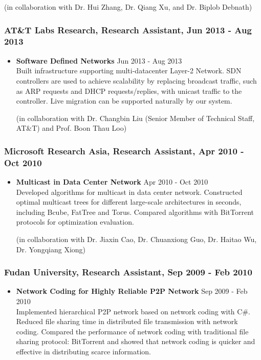 \documentclass[10pt]{res} %
\begin{document}
\begin{resume}
\begin{itemize}
(in collaboration with Dr. Hui Zhang, Dr. Qiang Xu, and Dr. Biplob Debnath)
\end{itemize}


\subsubsection{AT\&T Labs Research, Research Assistant, Jun 2013 - Aug 2013}
\begin{itemize}
\item {\bf Software Defined Networks} \hfill Jun 2013 - Aug 2013\\
Built infrastructure supporting multi-datacenter Layer-2 Network. SDN controllers
are used to achieve scalability by replacing broadcast traffic, such as ARP
requests and DHCP requests/replies, with unicast traffic to the controller. Live
migration can be supported naturally by our system.

(in collaboration with Dr. Changbin Liu (Senior Member of Technical Staff, AT\&T) and Prof. Boon Thau Loo)
\end{itemize}

\newpage

\subsubsection{Microsoft Research Asia, Research Assistant, Apr 2010 - Oct 2010}
\begin{itemize}
\item {\bf Multicast in Data Center Network} \hfill Apr 2010 - Oct 2010\\
Developed algorithms for multicast in data center network. Constructed optimal
multicast trees for different large-scale architectures in seconds, including
Bcube, FatTree and Torus. Compared algorithms with BitTorrent protocols for
optimization evaluation.

(in collaboration with Dr. Jiaxin Cao, Dr. Chuanxiong Guo, Dr. Haitao Wu, Dr. Yongqiang Xiong)
\end{itemize}

\subsubsection{Fudan University, Research Assistant, Sep 2009 - Feb 2010}
\begin{itemize}
\item {\bf Network Coding for Highly Reliable P2P Network} \hfill Sep 2009 - Feb 2010\\
Implemented hierarchical P2P network based on network coding with C$\#$. Reduced
file sharing time in distributed file transmission with network coding. Compared
the performance of network coding with traditional file sharing protocol:
BitTorrent and showed that network coding is quicker and effective in
distributing scarce information.


\end{itemize}
\end{resume}
\end{document}
